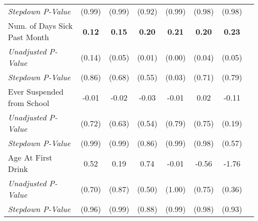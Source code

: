 \begin{tabular}{l c c c c c c c}
\quad \textit{Stepdown P-Value} & (0.99) & (0.99) & (0.92) & (0.99) & (0.98) & (0.98) \\
Num. of Days Sick Past Month & \textbf{ 0.12 } & \textbf{ 0.15 } & \textbf{ 0.20 } & \textbf{ 0.21 } & \textbf{ 0.20 } & \textbf{ 0.23 } \\
\quad \textit{Unadjusted P-Value} & (0.14) & (0.05) & (0.01) & (0.00) & (0.04) & (0.05) \\
\quad \textit{Stepdown P-Value} & (0.86) & (0.68) & (0.55) & (0.03) & (0.71) & (0.79) \\
Ever Suspended from School & -0.01 & -0.02 & -0.03 & -0.01 & 0.02 & -0.11 \\
\quad \textit{Unadjusted P-Value} & (0.72) & (0.63) & (0.54) & (0.79) & (0.75) & (0.19) \\
\quad \textit{Stepdown P-Value} & (0.99) & (0.99) & (0.86) & (0.99) & (0.98) & (0.57) \\
Age At First Drink & 0.52 & 0.19 & 0.74 & -0.01 & -0.56 & -1.76 \\
\quad \textit{Unadjusted P-Value} & (0.70) & (0.87) & (0.50) & (1.00) & (0.75) & (0.36) \\
\quad \textit{Stepdown P-Value} & (0.96) & (0.99) & (0.88) & (0.99) & (0.98) & (0.93) \\
\bottomrule
\end{tabular}
